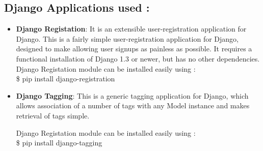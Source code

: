 \noindent \subsection{Django Applications used :}
\begin{itemize}
\item{\bf{Django Registation}}: It is an extensible 
user-registration application for Django. This is a fairly simple 
user-registration application for Django, designed to make allowing 
user signups as painless as possible. It requires a functional 
installation of Django 1.3 or newer, but has no other dependencies.\\
Django Registation module can be installed easily using :\\

\hspace{8pt} \$ pip install django-registration\\
 
\item{\bf{Django Tagging}}: This is a generic tagging 
application for Django, which allows association of a number of tags 
with any Model instance and makes retrieval of tags simple.

Django Registation module can be installed easily using :\\

\hspace{8pt} \$ pip install django-tagging\\
\end{itemize}
